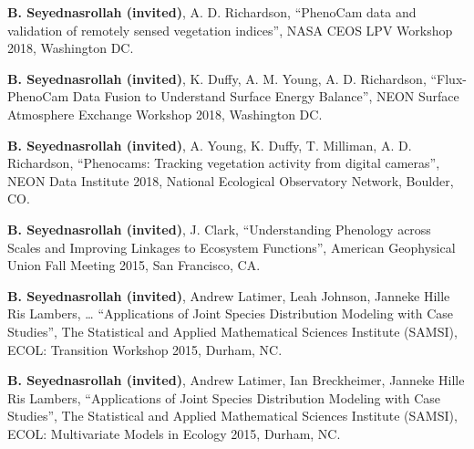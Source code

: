 \documentclass[10pt]{article}
\newenvironment{changemargin}[2]{%
  \begin{list}{}{%
 \setlength{\topsep}{0pt}%
 \setlength{\leftmargin}{#1}%
 \setlength{\rightmargin}{#2}%
 \setlength{\listparindent}{\parindent}%
 \setlength{\itemindent}{\parindent}%
 \setlength{\parsep}{\parskip}%
  }%
  \item[]}{\end{list}
}
\newenvironment{body} {
  \vspace*{-2pt}
  \begin{changemargin}{-0.5in}{-0.5in}
}
{\end{changemargin}
}
\begin{document}
\begin{body}

\textbf{B. Seyednasrollah (invited)}, A. D. Richardson, ``PhenoCam data and validation of remotely sensed vegetation indices'', NASA CEOS LPV Workshop 2018, Washington DC. \\
    \smallskip

\textbf{B. Seyednasrollah (invited)}, K. Duffy, A. M. Young, A. D. Richardson, ``Flux-PhenoCam Data Fusion to Understand Surface Energy Balance'', NEON Surface Atmosphere Exchange Workshop 2018, Washington DC. \\
    \smallskip

\textbf{B. Seyednasrollah (invited)}, A. Young, K. Duffy, T. Milliman, A. D. Richardson, ``Phenocams: Tracking vegetation activity from digital cameras'', NEON Data Institute 2018, National Ecological Observatory Network, Boulder, CO.\\
    \smallskip

\textbf{B. Seyednasrollah (invited)}, J. Clark, ``Understanding Phenology across Scales and Improving Linkages to Ecosystem Functions'', American Geophysical Union Fall Meeting 2015, San Francisco, CA.\\
    \smallskip

\textbf{B. Seyednasrollah (invited)}, Andrew Latimer, Leah Johnson, Janneke Hille Ris Lambers, … ``Applications of Joint Species Distribution Modeling with Case Studies'', The Statistical and Applied Mathematical Sciences Institute (SAMSI), ECOL: Transition Workshop 2015, Durham, NC.\\
    \smallskip

\textbf{B. Seyednasrollah (invited)}, Andrew Latimer, Ian Breckheimer, Janneke Hille Ris Lambers, ``Applications of Joint Species Distribution Modeling with Case Studies'', The Statistical and Applied Mathematical Sciences Institute (SAMSI), ECOL: Multivariate Models in Ecology 2015, Durham, NC.\\

\end{body}
\end{document}

